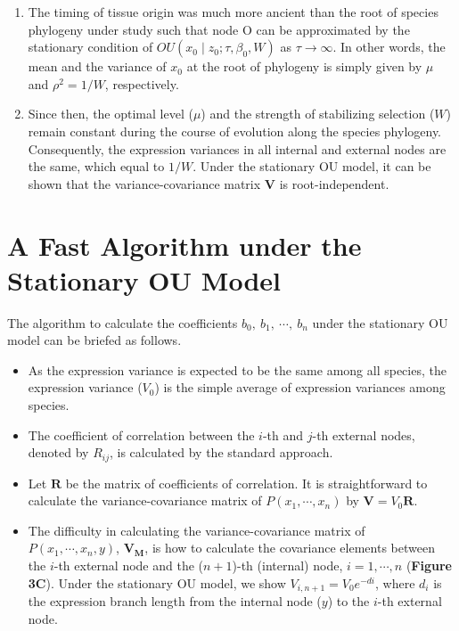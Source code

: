 \documentclass[]{book}
\providecommand{\tightlist}{%
  \setlength{\itemsep}{0pt}\setlength{\parskip}{0pt}}
\begin{document}
\begin{enumerate}
\def\labelenumi{\arabic{enumi}.}
\tightlist
\item
  The timing of tissue origin was much more ancient than the root of species phylogeny under study such that node O can be approximated by the stationary condition of \(OU\left(x_0\mid z_0; \tau,\beta_0, W\right)\) as \(\tau \rightarrow \infty\). In other words, the mean and the variance of \(x_0\) at the root of phylogeny is simply given by \(\mu\) and \(\rho^2 = 1/W\), respectively.
\item
  Since then, the optimal level (\(\mu\)) and the strength of stabilizing selection (\(W\)) remain constant during the course of evolution along the species phylogeny. Consequently, the expression variances in all internal and external nodes are the same, which equal to \(1/W\). Under the stationary OU model, it can be shown that the variance-covariance matrix \(\boldsymbol{V}\) is root-independent\citep{hansen1996}.
\end{enumerate}

\newpage

\hypertarget{a-fast-algorithm-under-the-stationary-ou-model}{%
\section{A Fast Algorithm under the Stationary OU Model}\label{a-fast-algorithm-under-the-stationary-ou-model}}

The algorithm to calculate the coefficients \(b_0,\  b_1,\  \cdots,\  b_n\) under the stationary OU model can be briefed as follows.

\begin{itemize}
\tightlist
\item
  As the expression variance is expected to be the same among all species, the expression variance (\(V_0\)) is the simple average of expression variances among species.
\item
  The coefficient of correlation between the \(i\)-th and \(j\)-th external nodes, denoted by \(R_{ij}\), is calculated by the standard approach.
\item
  Let \(\boldsymbol{R}\) be the matrix of coefficients of correlation. It is straightforward to calculate the variance-covariance matrix of \(P\left(x_1,\cdots,x_n\right)\) by \(\boldsymbol{V}=V_0\boldsymbol{R}\).\\
\item
  The difficulty in calculating the variance-covariance matrix of \(P\left(x_1,\cdots,x_n,y\right)\), \(\boldsymbol{V_M}\), is how to calculate the covariance elements between the \(i\)-th external node and the (\(n+1\))-th (internal) node, \(i=1,\cdots,n\) (\textbf{Figure 3C}). Under the stationary OU model, we show \(V_{i,n+1}=V_{0}e^{-di}\), where \(d_i\) is the expression branch length from the internal node (\(y\)) to the \(i\)-th external node.
\end{itemize}
\end{document}
